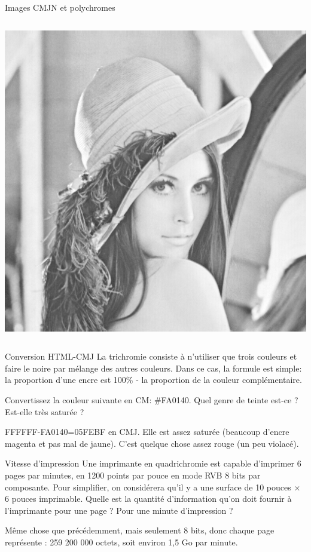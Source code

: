 \begin{frame}{Images CMJN et polychromes}
\begin{columns}
\begin{column}{.15\linewidth}
      \includegraphics[width=\linewidth]{img/06/lena-CMJN-noir}\\
    \end{column}
  \end{columns}
\end{frame}
\begin{exercice}
  \begin{exercicelet}{Conversion HTML-CMJ}
    La trichromie consiste à n'utiliser que trois couleurs et faire le noire
    par mélange des autres couleurs. Dans ce cas, la formule est simple: la
    proportion d'une encre est 100\% - la proportion de la couleur
    complémentaire.

    Convertissez la couleur suivante en CM: \#FA0140. Quel genre de teinte
    est-ce ?  Est-elle très saturée ?
    \begin{xcorrection}
      FFFFFF-FA0140=05FEBF en CMJ. Elle est assez saturée (beaucoup d'encre
      magenta et pas mal de jaune). C'est quelque chose assez rouge (un peu
      violacé).
    \end{xcorrection}
  \end{exercicelet}
  \begin{exercicelet}{Vitesse d'impression}
    Une imprimante en quadrichromie est capable d'imprimer 6 pages par
    minutes, en 1200 points par pouce en mode RVB 8 bits par composante. Pour
    simplifier, on considérera qu'il y a une surface de 10 pouces × 6 pouces
    imprimable. Quelle est la quantité d'information qu'on doit fournir à
    l'imprimante pour une page ? Pour une minute d'impression ?
    \begin{xcorrection}
      Même chose que précédemment, mais seulement 8 bits, donc chaque page
      représente : 259 200 000 octets, soit environ 1,5 Go par minute.
    \end{xcorrection}
  \end{exercicelet}
\end{exercice}
